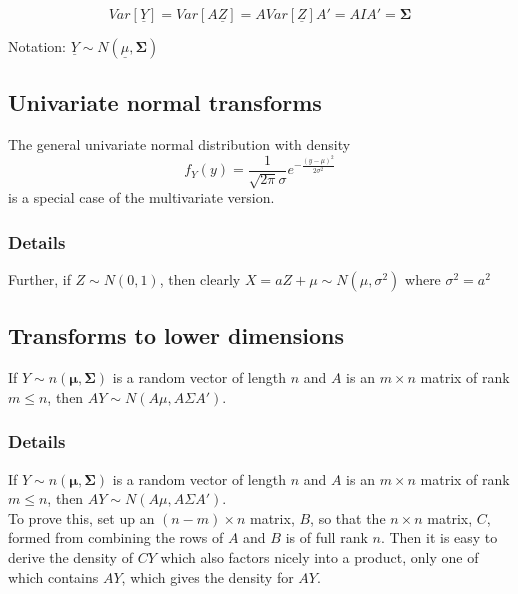 \documentclass[12pt,a4paper]{article}
\theoremstyle{regla}
\theoremstyle{remark}
\theoremstyle{definition}
\theoremstyle{nonumberbreak}
\begin{document}
$$Var[\underline{Y}] = Var[A\underline{Z}] = AVar[\underline{Z}]A' = AIA' = \boldsymbol{\Sigma}$$

Notation: $\underline{Y}\sim N(\underline{\mu}, \boldsymbol{\Sigma})$

\subsection{Univariate normal transforms}
\begin{fbox}
\begin{minipage}{0.97\textwidth}
The general univariate normal distribution with density 
$$
f_Y(y) = \frac{1}{\sqrt{2\pi}\sigma}e^{-\frac{(y-\mu)^2}{2\sigma^2}}
$$
is a special case of the multivariate version.
\end{minipage}
\end{fbox}
\subsubsection{Details}
Further, if $Z\sim N(0,1)$, then clearly $X=aZ+\mu \sim N(\mu,\sigma^2)$ where $\sigma^2=a^2$

\subsection{Transforms to lower dimensions}
\begin{fbox}
\begin{minipage}{0.97\textwidth}
If $Y\sim n \left ( \boldsymbol{\mu},\boldsymbol{\Sigma} \right )$ is a random vector of length $n$ and $A$ is an $m\times n$ matrix of rank $m\leq n$, then $AY \sim N(A\mu,A\Sigma A')$. 
\end{minipage}
\end{fbox}
\subsubsection{Details}
If $Y\sim n \left ( \boldsymbol{\mu},\boldsymbol{\Sigma} \right )$ is a random vector of length $n$ and $A$ is an $m\times n$ matrix of rank $m\leq n$, then $AY \sim N(A\mu,A\Sigma A')$. \\

To prove this, set up an $(n-m)\times n$ matrix, $B$, so that the $n\times n$ matrix, $C$, formed from combining the rows of $A$ and $B$ is of full rank $n$. Then it is easy to derive the density of $CY$ which also factors nicely into a product, only one of which contains $AY$, which gives the density for $AY$.
\end{document}
